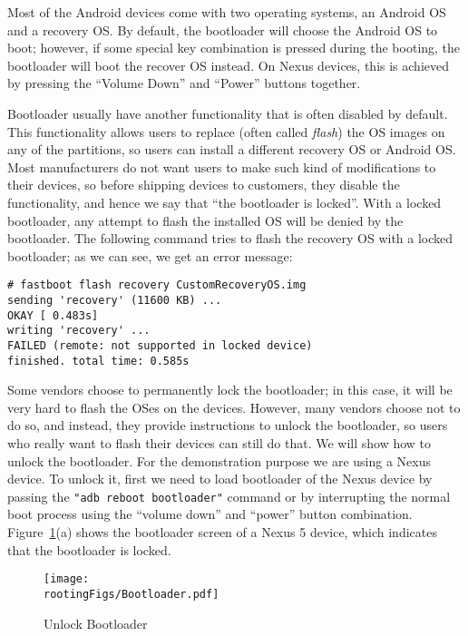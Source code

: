 Most of the Android devices come with two operating systems, an Android OS
and a recovery OS. By default, the bootloader will choose the Android OS to 
boot; however, if some special key combination is pressed during the
booting, the bootloader will boot the recover OS instead. On Nexus devices,
this is achieved by pressing the ``Volume Down'' and ``Power'' buttons together.


Bootloader usually have another functionality that is often disabled by
default. This functionality allows users to replace (often called
\textit{flash}) the OS images on any of
the partitions, so users can install a different recovery OS or Android OS. 
Most manufacturers do not want users to make such kind of modifications to
their devices, so before shipping devices to customers, they 
disable the functionality, and hence we say
that ``the bootloader is locked''.  With a locked bootloader, any attempt
to flash the installed OS will be denied by the bootloader. 
The following command tries to flash the recovery OS with a locked
bootloader; as we can see, we get an error message:

\begin{lstlisting}[frame=single, caption={}, label=label]
# fastboot flash recovery CustomRecoveryOS.img
sending 'recovery' (11600 KB) ...
OKAY [ 0.483s]
writing 'recovery' ...
FAILED (remote: not supported in locked device)
finished. total time: 0.585s
\end{lstlisting}


Some vendors choose to permanently lock the bootloader; in this case, it
will be very hard to flash the OSes on the devices. However,  
many vendors choose not to do so, and instead, they 
provide instructions to unlock the bootloader, so users who really want to
flash their devices can still do that. We will show how to unlock the
bootloader. For the demonstration purpose we are using a Nexus device.
To unlock it, first we need to load
bootloader of the Nexus device by passing the \texttt{"adb reboot
bootloader"} command or by interrupting the normal boot process using 
the ``volume down'' and ``power'' button combination.
Figure~\ref{fig:rooting:bootloader}(a)  shows the bootloader screen of
a Nexus 5 device, which indicates that the bootloader is
locked.

\begin{figure}[htb]
	\begin{center}
		\texttt{[image: \\rootingFigs/Bootloader.pdf]}
	\end{center}
	\caption{Unlock Bootloader}
	\label{fig:rooting:bootloader}
\end{figure}


